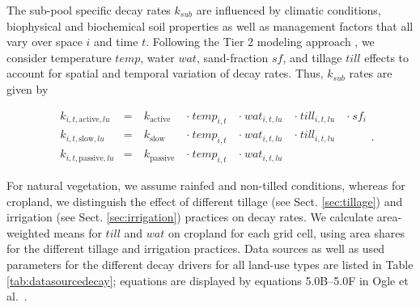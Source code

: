 \documentclass[gc, manuscript]{copernicus}
\begin{document}
The sub-pool specific decay rates \(k_{sub}\) are influenced by climatic conditions, biophysical and biochemical soil properties as well as management factors that all vary over space \(i\) and time \(t\). Following the Tier 2 modeling approach \citep{ogle_cropland_in_ipcc_2019}, we consider temperature \(temp\), water \(wat\), sand-fraction \(sf\), and tillage \(till\) effects to account for spatial and temporal variation of decay rates. Thus, \(k_{sub}\) rates are given by

\begin{equation}
\begin{aligned}
& k_{i,t,\mathrm{active},lu}  & = &~ k_{\mathrm{active}}  ~ &\cdot~ temp_{i,t} ~ &\cdot~ wat_{i,t,lu} ~ &\cdot~ till_{i,t,lu} ~ & \cdot~ sf_{i}\\
& k_{i,t,\mathrm{slow},lu}    & = &~ k_{\mathrm{slow}}    ~ &\cdot~ temp_{i,t} ~ &\cdot~ wat_{i,t,lu} ~ &\cdot~ till_{i,t,lu} ~ &\\
& k_{i,t,\mathrm{passive},lu} & = &~ k_{\mathrm{passive}} ~ &\cdot~ temp_{i,t} ~ &\cdot~ wat_{i,t,lu} ~ & ~ & 
\label{eq:decayrates}
\end{aligned}.
\end{equation}

For natural vegetation, we assume rainfed and non-tilled conditions, whereas for cropland, we distinguish the effect of different tillage (see Sect. \ref{sec:tillage}) and irrigation (see Sect. \ref{sec:irrigation}) practices on decay rates. We calculate area-weighted means for \(till\) and \(wat\) on cropland for each grid cell, using area shares for the different tillage and irrigation practices. Data sources as well as used parameters for the different decay drivers for all land-use types are listed in Table \ref{tab:datasourcedecay}; equations are displayed by equations 5.0B--5.0F in Ogle et al.~\citeyearpar{ogle_cropland_in_ipcc_2019}.
\end{document}
